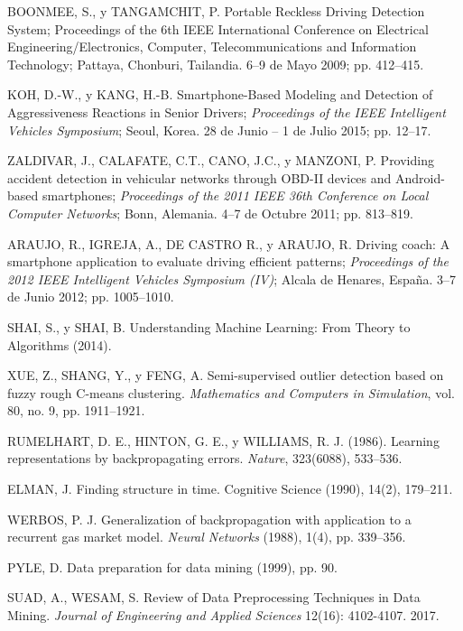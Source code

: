 \begin{thebibliography}{9}
BOONMEE, S., y TANGAMCHIT, P. Portable Reckless Driving Detection System; Proceedings of the 6th IEEE International Conference on Electrical Engineering/Electronics, Computer, Telecommunications and Information Technology; Pattaya, Chonburi, Tailandia. 6–9 de Mayo 2009; pp. 412–415.

KOH, D.-W., y KANG, H.-B. Smartphone-Based Modeling and Detection of Aggressiveness Reactions in Senior Drivers; \textit{Proceedings of the IEEE Intelligent Vehicles Symposium}; Seoul, Korea. 28 de Junio – 1 de Julio 2015; pp. 12–17.

ZALDIVAR, J., CALAFATE, C.T., CANO, J.C., y MANZONI, P. Providing accident detection in vehicular networks through OBD-II devices and Android-based smartphones; \textit{Proceedings of the 2011 IEEE 36th Conference on Local Computer Networks}; Bonn, Alemania. 4–7 de Octubre 2011; pp. 813–819.

ARAUJO, R., IGREJA, A., DE CASTRO R., y ARAUJO, R. Driving coach: A smartphone application to evaluate driving efficient patterns; \textit{Proceedings of the 2012 IEEE Intelligent Vehicles Symposium (IV)}; Alcala de Henares, Espa\~{n}a. 3–7 de Junio 2012; pp. 1005–1010.

SHAI, S., y SHAI, B. Understanding Machine Learning: From Theory to Algorithms (2014).

XUE, Z., SHANG, Y., y FENG, A. Semi-supervised outlier detection based on fuzzy rough C-means clustering. \textit{Mathematics and Computers in Simulation}, vol. 80, no. 9, pp. 1911–1921.

RUMELHART, D. E., HINTON, G. E., y WILLIAMS, R. J. (1986). Learning representations by backpropagating errors. \textit{Nature}, 323(6088), 533–536.

ELMAN, J. Finding structure in time. Cognitive Science (1990), 14(2), 179–211.

WERBOS, P. J. Generalization of backpropagation with application to a recurrent gas market model. \textit{Neural Networks} (1988), 1(4), pp. 339–356.

PYLE, D. Data preparation for data mining (1999), pp. 90.

SUAD, A., WESAM, S. Review of Data Preprocessing Techniques in Data Mining. \textit{Journal of Engineering and Applied Sciences} 12(16): 4102-4107. 2017.


\end{thebibliography}
